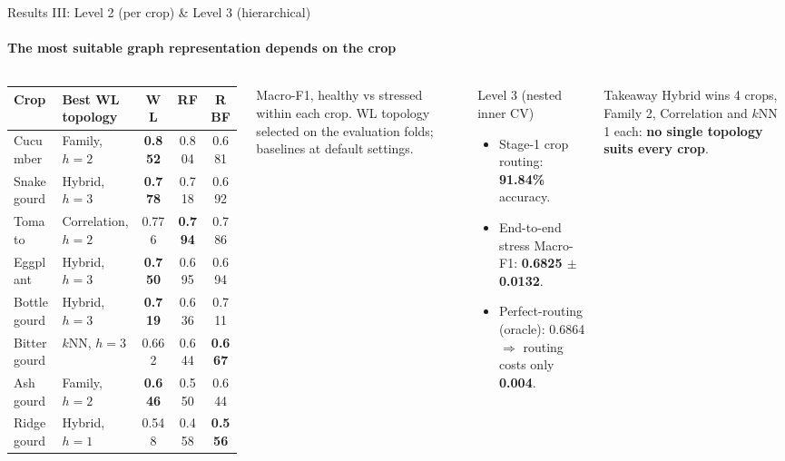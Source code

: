 \documentclass[aspectratio=169, 11pt]{beamer}
\begin{document}
\begin{frame}{Results III: Level 2 (per crop) \& Level 3 (hierarchical)}
    \framesubtitle{The most suitable graph representation depends on the crop}
    \begin{columns}[T]
        \scriptsize
        \renewcommand{\arraystretch}{1.08}
        \begin{tabular}{@{}llccc@{}}
            \toprule
            \textbf{Crop} & \textbf{Best WL topology} & \textbf{WL} & \textbf{RF} & \textbf{RBF} \\
            \midrule
            Cucumber & Family, $h=2$ & \textbf{0.852} & 0.804 & 0.681 \\
            Snake gourd & Hybrid, $h=3$ & \textbf{0.778} & 0.718 & 0.692 \\
            Tomato & Correlation, $h=2$ & 0.776 & \textbf{0.794} & 0.786 \\
            Eggplant & Hybrid, $h=3$ & \textbf{0.750} & 0.695 & 0.694 \\
            Bottle gourd & Hybrid, $h=3$ & \textbf{0.719} & 0.636 & 0.711 \\
            Bitter gourd & $k$NN, $h=3$ & 0.662 & 0.644 & \textbf{0.667} \\
            Ash gourd & Family, $h=2$ & \textbf{0.646} & 0.550 & 0.644 \\
            Ridge gourd & Hybrid, $h=1$ & 0.548 & 0.458 & \textbf{0.556} \\
            \bottomrule
        \end{tabular}

        \vspace{0.05cm}
        {\tiny Macro-F1, healthy vs stressed within each crop. WL topology selected on the evaluation folds; baselines at default settings.}

        \begin{block}{Level 3 (nested inner CV)}
            \scriptsize
            \begin{itemize}
                \item Stage-1 crop routing: \textbf{91.84\%} accuracy.
                \item End-to-end stress Macro-F1: \textbf{0.6825 $\pm$ 0.0132}.
                \item Perfect-routing (oracle): 0.6864 $\Rightarrow$ routing costs only \textbf{0.004}.
            \end{itemize}
        \end{block}
        \begin{block}{Takeaway}
            \scriptsize Hybrid wins 4 crops, Family 2, Correlation and $k$NN 1 each: \textbf{no single topology suits every crop}.
        \end{block}
    \end{columns}
\end{frame}
\end{document}
